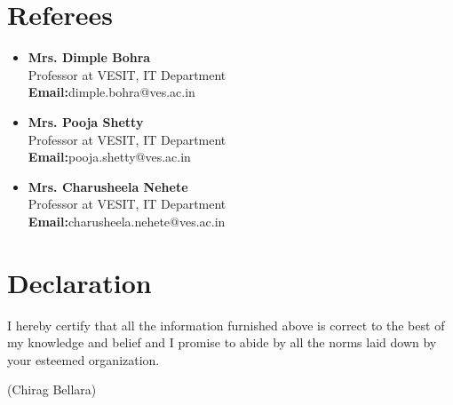 \documentclass[11pt,a4paper]{moderncv}
\begin{document}

\section{Referees}

\begin{itemize}  	
	
    \item \textbf{Mrs. Dimple Bohra}\\
	Professor at VESIT, IT Department\\
	\textbf{Email:}dimple.bohra@ves.ac.in
	
	\item \textbf{Mrs. Pooja Shetty}\\
    Professor at VESIT, IT Department\\
	\textbf{Email:}pooja.shetty@ves.ac.in
	
	\item \textbf{Mrs. Charusheela Nehete}\\
	Professor at VESIT, IT Department\\
	\textbf{Email:}charusheela.nehete@ves.ac.in

\end{itemize}

\section{Declaration}
I hereby certify that all the information furnished above is correct to the best of my knowledge and belief and I promise to abide by all the norms laid down by your esteemed organization.

\vskip10mm\raggedleft
(Chirag Bellara)
\end{document}
